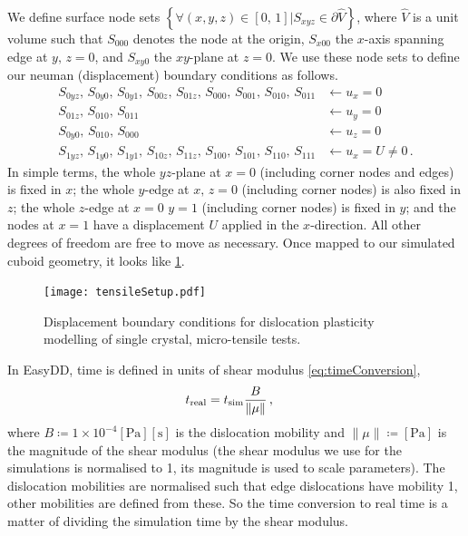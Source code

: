 We define surface node sets $\left\{\forall (x, y, z) \in [0,\, 1] \vert S_{xyz} \in \partial \hat{V}\right\}$, where $\hat{V}$ is a unit volume such that $S_{000}$ denotes the node at the origin, $S_{x00}$ the $x$-axis spanning edge at $y,\, z=0$, and $S_{xy0}$ the $xy$-plane at $z=0$. We use these node sets to define our neuman (displacement) boundary conditions as follows.
\begin{subequations}
    \begin{align}
        S_{0yz},\, S_{0y0},\, S_{0y1},\, S_{00z},\, S_{01z},\, S_{000},\, S_{001},\, S_{010},\, S_{011} & \gets u_x = 0           \\
        S_{01z},\, S_{010},\, S_{011}                                                                   & \gets u_y = 0           \\
        S_{0y0},\, S_{010},\, S_{000}                                                                   & \gets u_z = 0           \\
        S_{1yz},\, S_{1y0},\, S_{1y1},\, S_{10z},\, S_{11z},\, S_{100},\, S_{101},\, S_{110},\, S_{111} & \gets u_x = U \neq 0\,.
    \end{align}
\end{subequations}
In simple terms, the whole $yz$-plane at $x=0$ (including corner nodes and edges) is fixed in $x$; the whole $y$-edge at $x,\,z=0$ (including corner nodes) is also fixed in $z$; the whole $z$-edge at $x = 0\,\, y = 1$ (including corner nodes) is fixed in $y$; and the nodes at $x=1$ have a displacement $U$ applied in the $x$-direction. All other degrees of freedom are free to move as necessary. Once mapped to our simulated cuboid geometry, it looks like \cref{f:tensileSetup}.
\begin{figure}
    \centering
    \texttt{[image: tensileSetup.pdf]}
    \caption[Displacement boundary conditions for dislocation plasticity modelling of single crystal, micro-tensile tests.]{Displacement boundary conditions for dislocation plasticity modelling of single crystal, micro-tensile tests.}
    \label{f:tensileSetup}
\end{figure}

In EasyDD, time is defined in units of shear modulus \cref{eq:timeConversion},
\begin{align}\label{eq:timeConversion}
    t_{\textrm{real}} & = t_{\textrm{sim}} \dfrac{B}{\lVert\mu\rVert}\,,
\end{align}
where $B \coloneqq 1 \times 10^{-4}[\si{\pascal}][\si{\second}]$ is the dislocation mobility and $\lVert\mu\rVert \coloneqq [\si{\pascal}]$ is the magnitude of the shear modulus (the shear modulus we use for the simulations is normalised to 1, its magnitude is used to scale parameters). The dislocation mobilities are normalised such that edge dislocations have mobility 1, other mobilities are defined from these. So the time conversion to real time is a matter of dividing the simulation time by the shear modulus.

